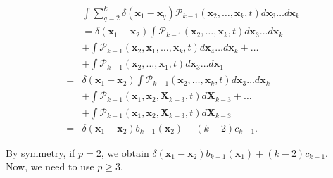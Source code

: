 \begin{subequations} 
\begin{flalign}
& \int \sum_{q=2}^{k}\delta({\boldsymbol{x}_1-\boldsymbol{x}_q})\mathcal{P}_{k-1}(\boldsymbol{x}_{2},\ldots,\boldsymbol{x}_{k},t) d\boldsymbol{x}_{3}\ldots d\boldsymbol{x}_{k}\\
& =  \delta(\boldsymbol{x}_{1}-\boldsymbol{x}_{2})\int\mathcal{P}_{k-1}(\boldsymbol{x}_{2},\ldots,\boldsymbol{x}_{k},t)d\boldsymbol{x}_{3}\ldots d\boldsymbol{x}_{k}\\
&+ \int\mathcal{P}_{k-1}(\boldsymbol{x}_{2},\boldsymbol{x}_{1},\ldots,\boldsymbol{x}_{k},t)d\boldsymbol{x}_{4}\ldots d\boldsymbol{x}_{k} + \ldots \\
& +\int\mathcal{P}_{k-1}(\boldsymbol{x}_{2},\ldots,\boldsymbol{x}_{1},t)d\boldsymbol{x}_{3}\ldots d\boldsymbol{x}_{1}\\
=&\delta(\boldsymbol{x}_{1}-\boldsymbol{x}_{2})\int\mathcal{P}_{k-1}(\boldsymbol{x}_{2},\ldots,\boldsymbol{x}_{k},t)d\boldsymbol{x}_{3}\ldots d\boldsymbol{x}_{k}\\
 & +\int\mathcal{P}_{k-1}(\boldsymbol{x}_{1},\boldsymbol{x}_{2},\boldsymbol{X}_{k-3},t)d\boldsymbol{X}_{k-3}+\ldots\\
 & +\int\mathcal{P}_{k-1}(\boldsymbol{x}_{1},\boldsymbol{x}_{2},\boldsymbol{X}_{k-3},t)d\boldsymbol{X}_{k-3}\\
= & \delta(\boldsymbol{x}_{1}-\boldsymbol{x}_{2})b_{k-1}(\boldsymbol{x}_{2})+(k-2)c_{k-1}.
\end{flalign}
\end{subequations}

By symmetry, if $p=2$, we obtain $\delta(\boldsymbol{x}_{1}-\boldsymbol{x}_{2})b_{k-1}(\boldsymbol{x}_{1})+(k-2)c_{k-1}$.\\

Now, we need to use $p\geq3$.

